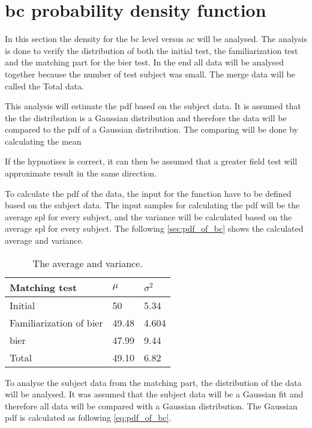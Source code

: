 \section{\gls{bc} probability density function}
In this section the density for the \gls{bc} level versus \gls{ac} will be analysed. The analysis is done to verify the distribution of both the initial test, the familiarization test and the matching part for the \gls{bier} test. In the end all data will be analysed together because the number of test subject was small. The merge data will be called the Total data.

This analysis will estimate the \gls{pdf} based on the subject data. It is assumed that the the distribution is a Gaussian distribution and therefore the data will be compared to the \gls{pdf} of a Gaussian distribution. The comparing will be done by calculating the mean 

 If the hypnotises is correct, it can then be assumed that a greater field test will approximate result in the same direction.

To calculate the \gls{pdf} of the data, the input for the function have to be defined based on the subject data. The input samples for calculating the  \gls{pdf} will be the average \gls{spl} for every subject, and the variance will be calculated based on the average \gls{spl} for every subject. The following \autoref{sec:pdf_of_bc} shows the calculated average and variance. 

\begin{table}[H]
\centering
\caption{The average and variance.}
\begin{tabular}{l|ll}
Matching test                 & $\mu$ & $\sigma^2$ \\ \hline
Initial                       & 50    & 5.34       \\
Familiarization of \gls{bier} & 49.48 & 4.604      \\
\gls{bier}                    & 47.99 & 9.44      \\
Total                    & 49.10 & 6.82      
\end{tabular}
\label{sec:pdf_of_bc}
\end{table}

To analyse the subject data from the matching part, the distribution of the data will be analysed. It was assumed that the subject data will be a Gaussian fit and therefore all data will be compared with a Gaussian distribution. The Gaussian \gls{pdf} is calculated as following \autoref{eq:pdf_of_bc}.

